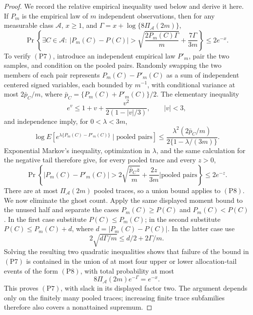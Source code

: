 \documentclass{article}
\begin{document}
\begin{proof}
We record the relative empirical inequality used below and derive it here.
If \(P_m\) is the empirical law of \(m\) independent observations, then for
any measurable class \(\mathcal A\), \(x\geq1\), and
\(\Gamma=x+\log\{8\Pi_{\mathcal A}(2m)\}\),
\[
 \Pr\!\left\{\exists C\in\mathcal A:\ |P_m(C)-P(C)|>
 \sqrt{\frac{2P_m(C)\Gamma}{m}}+\frac{7\Gamma}{3m}\right\}
 \leq2e^{-x}.
 \tag{P7}
\]
To verify \((\mathrm{P7})\), introduce an independent empirical law
\(P'_m\), pair the two samples, and condition on the pooled pairs.  Randomly
swapping the two members of each pair represents
\(P_m(C)-P'_m(C)\) as a sum of independent centered signed variables, each
bounded by \(m^{-1}\), with conditional variance at most
\(2\bar p_C/m\), where
\(\bar p_C=\{P_m(C)+P'_m(C)\}/2\).  The elementary inequality
\[
 e^v\leq1+v+\frac{v^2}{2(1-|v|/3)},\qquad |v|<3,
\]
and independence imply, for \(0<\lambda<3m\),
\[
 \log E\!\left[
 e^{\lambda\{P_m(C)-P'_m(C)\}}\mid\text{pooled pairs}\right]
 \leq\frac{\lambda^2(2\bar p_C/m)}{2\{1-\lambda/(3m)\}}.
\]
Exponential Markov's inequality, optimization in \(\lambda\), and the same
calculation for the negative tail therefore give, for every pooled trace and
every \(z>0\),
\[
 \Pr\!\left\{|P_m(C)-P'_m(C)|>
 2\sqrt{\frac{\bar p_Cz}{m}}+\frac{2z}{3m}
 \mathrel{\Big|}\text{pooled pairs}\right\}\leq2e^{-z}.
 \tag{P8}
\]
There are at most \(\Pi_{\mathcal A}(2m)\) pooled traces, so a union bound
applies to \((\mathrm{P8})\).  We now eliminate the ghost count.  Apply the
same displayed moment bound to the unused half and separate the cases
\(P_m(C)\geq P(C)\) and \(P_m(C)<P(C)\).  In the first case substitute
\(P(C)\leq P_m(C)\); in the second substitute
\(P(C)\leq P_m(C)+d\), where \(d=|P_m(C)-P(C)|\).  In the latter case use
\[
 2\sqrt{d\Gamma/m}\leq d/2+2\Gamma/m.
\]
Solving the resulting two quadratic inequalities shows that failure of the
bound in \((\mathrm{P7})\) is contained in the union of at most four upper
or lower allocation-tail events of the form \((\mathrm{P8})\), with total
probability at most
\[
 8\Pi_{\mathcal A}(2m)e^{-\Gamma}=e^{-x}.
\]
This proves \((\mathrm{P7})\), with slack in its displayed factor two.  The
argument depends only on the finitely many pooled traces; increasing finite
trace subfamilies therefore also covers a nonattained supremum.


\end{proof}
\end{document}
